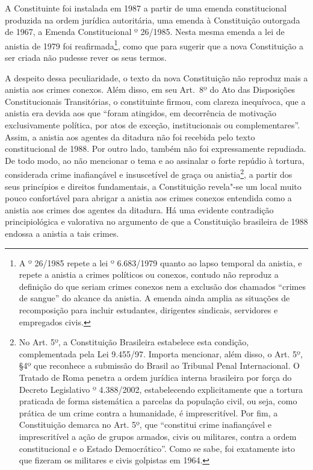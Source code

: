 A Constituinte foi instalada em 1987 a partir de uma emenda
constitucional produzida na ordem jurídica autoritária, uma emenda à
Constituição outorgada de 1967, a Emenda Constitucional º 26/1985.
Nesta mesma emenda a lei de anistia de 1979 foi reafirmada\footnote{A 
  º 26/1985 repete a lei º 6.683/1979 quanto ao lapso temporal da
  anistia, e repete a anistia a crimes políticos ou conexos, contudo não
  reproduz a definição do que seriam crimes conexos nem a exclusão dos
  chamados ``crimes de sangue'' do alcance da anistia. A emenda ainda
  amplia as situações de recomposição para incluir estudantes,
  dirigentes sindicais, servidores e empregados civis.}, como que para
sugerir que a nova Constituição a ser criada não pudesse rever os seus
termos.

A despeito dessa peculiaridade, o texto da nova Constituição não
reproduz mais a anistia aos crimes conexos. Além disso, em seu Art.~8º
do Ato das Disposições Constitucionais Transitórias, o constituinte
firmou, com clareza inequívoca, que a anistia era devida aos que ``foram
atingidos, em decorrência de motivação exclusivamente política, por atos
de exceção, institucionais ou complementares''. Assim, a anistia aos
agentes da ditadura não foi recebida pelo texto constitucional de 1988.
Por outro lado, também não foi expressamente repudiada. De todo modo, ao
não mencionar o tema e ao assinalar o forte repúdio à tortura,
considerada crime inafiançável e insuscetível de graça ou
anistia\footnote{No Art. 5º,  a Constituição Brasileira estabelece
  esta condição, complementada pela Lei 9.455/97. Importa mencionar,
  além disso, o Art. 5º, §4º que reconhece a submissão do Brasil ao
  Tribunal Penal Internacional. O Tratado de Roma penetra a ordem
  jurídica interna brasileira por força do Decreto Legislativo º
  4.388/2002, estabelecendo explicitamente que a tortura praticada de
  forma sistemática a parcelas da população civil, ou seja, como prática
  de um crime contra a humanidade, é imprescritível. Por fim, a
  Constituição demarca no Art. 5º,  que ``constitui crime
      inafiançável e imprescritível a ação de grupos armados, civis ou
      militares, contra a ordem constitucional e o Estado Democrático''. Como
  se sabe, foi exatamente isto que fizeram os militares e civis
  golpistas em 1964.}, a partir dos seus princípios e direitos
fundamentais, a Constituição revela"-se um local muito pouco confortável
para abrigar a anistia aos crimes conexos entendida como a anistia aos
crimes dos agentes da ditadura. Há uma evidente contradição
principiológica e valorativa no argumento de que a Constituição
brasileira de 1988 endossa a anistia a tais crimes.

